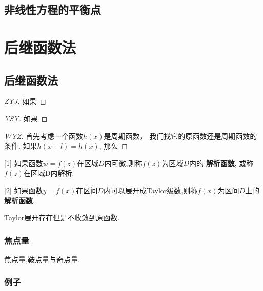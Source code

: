 \subsection{非线性方程的平衡点}

\section{后继函数法}
\subsection{后继函数法}
\begin{lemma}
  \label{lemma1}

\end{lemma}

\begin{proof}[ZYJ]
如果
\end{proof}

\begin{proof}[YSY]
如果
\end{proof}

\begin{proof}[WYZ]
  首先考虑一个函数$h(x)$是周期函数，
  我们找它的原函数还是周期函数的条件.
  如果$h(x+l)=h(x)$,
  那么
\end{proof}

\begin{defination}\ref{1}
  如果函数$w=f(z)$在区域$D$内可微,则称$f(z)$为区域$D$内的 \textbf{解析函数},
  或称$f(z)$在区域D内解析.
\end{defination}

\begin{defination}\ref{2}
如果函数$y=f(x)$在区间$D$内可以展开成Taylor级数,则称$f(x)$为区间$D$上的\textbf{解析函数}.
\end{defination}

\begin{note}[反例1]
  Taylor展开存在但是不收敛到原函数.
\end{note}
\subsubsection{焦点量}

\begin{note}
  焦点量,鞍点量与奇点量.
\end{note}
\subsubsection{例子}
